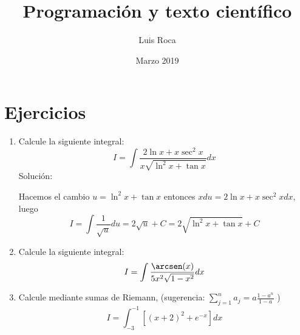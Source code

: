 \documentclass[a4paper,12pt]{article}
\title{Programación  y texto científico}
\author{Luis Roca}
\date{Marzo 2019}
\begin{document}
\maketitle
\section{Ejercicios}
\begin{enumerate}
    \item Calcule la siguiente integral:
\begin{equation*}
    I=\int \frac{2\ln x + x\sec^2 x}{
    x\sqrt{\ln^2 x+\tan x}} dx
\end{equation*}
Solución:

Hacemos el cambio $u=\ln^2 x+\tan x$ entonces $xdu=2\ln x+x\sec^2 x dx$, luego
\begin{equation*}
   I=\int \frac{1}{\sqrt{u}}du=2\sqrt{u}+C=2\sqrt{\ln^2 x+\tan x}+C
\end{equation*}
\item Calcule la siguiente integral:
\begin{equation*}
    I=\int \frac{\arcsen (x)}{5x^2\sqrt{1-x^2}} dx
\end{equation*}
\item Calcule mediante sumas de Riemann, \Big(sugerencia: $\sum_{j=1}^{n} a_j=a\frac{1-a^n}{1-a}$ \Big)
\begin{equation*}
    I=\int_{-3}^{-1} [ (x+2)^2+e^{-x} ] dx
\end{equation*}
\end{enumerate}
\end{document}
